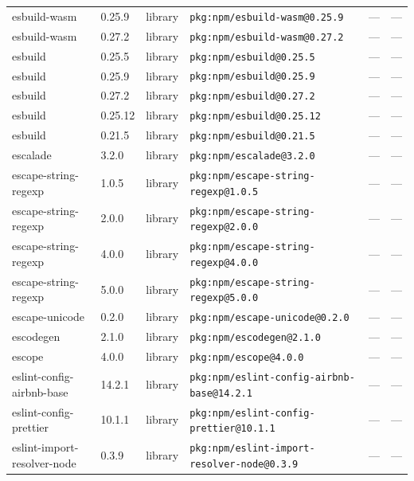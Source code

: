 \documentclass[11pt,a4paper]{article}
\begin{document}
\begin{longtable}{|p{4cm}|p{2cm}|p{1.6cm}|p{5cm}|p{1.5cm}|p{3.5cm}|}
\raggedright esbuild-wasm & 0.25.9 & library & \small\texttt{pkg:npm/esbuild-wasm@0.25.9} & — & \small — \\
\raggedright esbuild-wasm & 0.27.2 & library & \small\texttt{pkg:npm/esbuild-wasm@0.27.2} & — & \small — \\
\raggedright esbuild & 0.25.5 & library & \small\texttt{pkg:npm/esbuild@0.25.5} & — & \small — \\
\raggedright esbuild & 0.25.9 & library & \small\texttt{pkg:npm/esbuild@0.25.9} & — & \small — \\
\raggedright esbuild & 0.27.2 & library & \small\texttt{pkg:npm/esbuild@0.27.2} & — & \small — \\
\raggedright esbuild & 0.25.12 & library & \small\texttt{pkg:npm/esbuild@0.25.12} & — & \small — \\
\raggedright esbuild & 0.21.5 & library & \small\texttt{pkg:npm/esbuild@0.21.5} & — & \small — \\
\raggedright escalade & 3.2.0 & library & \small\texttt{pkg:npm/escalade@3.2.0} & — & \small — \\
\raggedright escape-string-regexp & 1.0.5 & library & \small\texttt{pkg:npm/escape-string-regexp@1.0.5} & — & \small — \\
\raggedright escape-string-regexp & 2.0.0 & library & \small\texttt{pkg:npm/escape-string-regexp@2.0.0} & — & \small — \\
\raggedright escape-string-regexp & 4.0.0 & library & \small\texttt{pkg:npm/escape-string-regexp@4.0.0} & — & \small — \\
\raggedright escape-string-regexp & 5.0.0 & library & \small\texttt{pkg:npm/escape-string-regexp@5.0.0} & — & \small — \\
\raggedright escape-unicode & 0.2.0 & library & \small\texttt{pkg:npm/escape-unicode@0.2.0} & — & \small — \\
\raggedright escodegen & 2.1.0 & library & \small\texttt{pkg:npm/escodegen@2.1.0} & — & \small — \\
\raggedright escope & 4.0.0 & library & \small\texttt{pkg:npm/escope@4.0.0} & — & \small — \\
\raggedright eslint-config-airbnb-base & 14.2.1 & library & \small\texttt{pkg:npm/eslint-config-airbnb-base@14.2.1} & — & \small — \\
\raggedright eslint-config-prettier & 10.1.1 & library & \small\texttt{pkg:npm/eslint-config-prettier@10.1.1} & — & \small — \\
\raggedright eslint-import-resolver-node & 0.3.9 & library & \small\texttt{pkg:npm/eslint-import-resolver-node@0.3.9} & — & \small — \\

\end{longtable}
\end{document}
